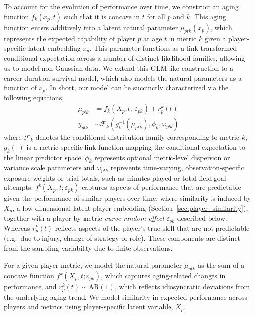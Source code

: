 \documentclass[aoas]{imsart}
\begin{document}
To account for the evolution of performance over time, we construct an aging function $f_k(x_p,t)$ such that it is concave in $t$ for all $p$ and $k$. This aging function enters additively into a latent natural parameter $\mu_{ptk}(x_p)$, which represents the expected capability of player $p$ at age $t$ in metric $k$ given a player-specific latent embedding $x_p$. This parameter functions as a link-transformed conditional expectation across a number of distinct likelihood families, allowing us to model non-Gaussian data. We extend this GLM-like construction to a career duration survival model, which also models the natural parameters as a function of $x_p$.  In short, our model can be succinctly characterized via the following equations, 
%
\begin{align}
\mu_{ptk} &= f_k(X_p,t;\, \varepsilon_{pk}) + r^k_p(t) \\
y_{p t k} &\sim \mathcal{F}_k\left(g_k^{-1}\left(\mu_{p t k}\right), \phi_k, \omega_{p t k}\right)
\end{align}
%
where $\mathcal{F}_k$ denotes the conditional distribution family corresponding to metric $k$,  $g_k(\cdot)$ is a metric-specific link function mapping the conditional expectation to the linear predictor space.  $\phi_k$ represents optional metric-level dispersion or variance scale parameters and $\omega_{ptk}$ represents time-varying, observation-specific exposure weights or trial totals, such as minutes played or total field goal attempts. $f^k(X_p,t;\varepsilon_{pk})$ captures aspects of performance that are predictable given the performance of similar players over time, where similarity is induced by $X_p$, a low-dimensional latent player embedding (Section~\ref{sec:player_similarity}), together with a player-by-metric \emph{curve random effect} $\varepsilon_{pk}$ described below.  Whereas $r_p^k(t)$ reflects aspects of the player's true skill that are not predictable (e.g.\ due to injury, change of strategy or role).  These components are distinct from the sampling variability due to finite observations.

For a given player-metric, we model the natural parameter $\mu_{ptk}$  as the sum of a concave function $f^k(X_p,t;\varepsilon_{pk})$, which captures aging-related changes in performance, and $r^k_p(t) \sim \mathrm{AR}(1)$, which reflects idiosyncratic deviations from the underlying aging trend. We model similarity in expected performance across players and metrics using player-specific latent variable, $X_p$.
\end{document}

